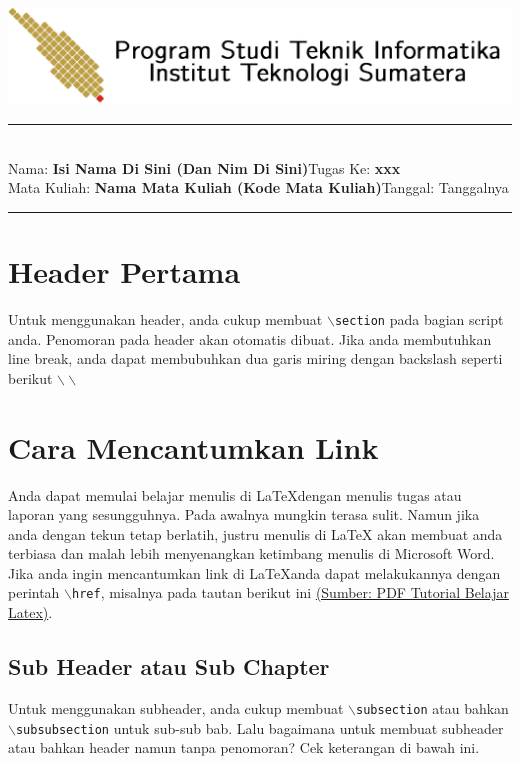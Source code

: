\documentclass[11pt,a4paper]{article}
\newcommand{\student}{\textbf{Isi Nama Di Sini (Dan Nim Di Sini)}}
\newcommand{\course}{\textbf{Nama Mata Kuliah (Kode Mata Kuliah)}}
\newcommand{\assignment}{\textbf{xxx}}
\begin{document}
\thispagestyle{empty}
\begin{center}
	\includegraphics[scale = 0.15]{Figure/ifitera-header.png}
	\vspace{0.1cm}
\end{center}
\noindent
\rule{17cm}{0.2cm}\\[0.3cm]
Nama: \student \hfill Tugas Ke: \assignment\\[0.1cm]
Mata Kuliah: \course \hfill Tanggal: Tanggalnya\\
\rule{17cm}{0.05cm}
\vspace{0.1cm}



\section{Header Pertama}
    Untuk menggunakan header, anda cukup membuat $\backslash${\tt{section}} pada bagian script anda. Penomoran pada header akan otomatis dibuat. Jika anda membutuhkan line break, anda dapat membubuhkan dua garis miring dengan backslash seperti berikut $\backslash\backslash$

\section{Cara Mencantumkan Link}
    Anda dapat memulai belajar menulis di \LaTeX dengan menulis tugas atau laporan yang sesungguhnya. Pada awalnya mungkin terasa sulit. Namun jika anda dengan tekun tetap berlatih, justru menulis di LaTeX akan membuat anda terbiasa dan malah lebih menyenangkan ketimbang menulis di Microsoft Word.\\
    Jika anda ingin mencantumkan link di \LaTeX anda dapat melakukannya dengan perintah $\backslash${\tt{href}}, misalnya pada tautan berikut ini \href{http://aldi_tob_2000.staff.gunadarma.ac.id/Downloads/files/17359/Membuat+dokumen+dengan+latex.pdf}{(Sumber: PDF Tutorial Belajar Latex)}.
    
\subsection{Sub Header atau Sub Chapter}
     Untuk menggunakan subheader, anda cukup membuat $\backslash${\tt{subsection}} atau bahkan  $\backslash${\tt{subsubsection}} untuk sub-sub bab. Lalu bagaimana untuk membuat subheader atau bahkan header namun tanpa penomoran? Cek keterangan di bawah ini.
\end{document}
